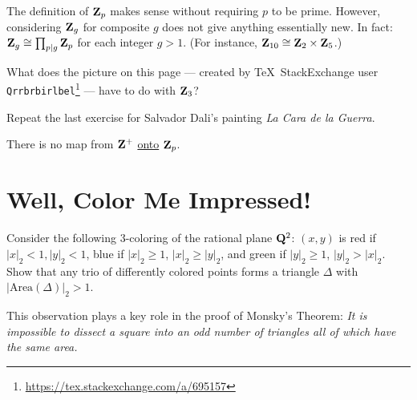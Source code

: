 \begin{prob}\label{prob:59} The definition of $\Z_p$ makes sense without requiring $p$ to be prime. However, considering $\mathbf{Z}_g$ for composite $g$ does not give anything essentially new. In fact: $\mathbf{Z}_{g}\cong \prod_{p\mid g} \mathbf{Z}_p$ for each integer $g>1$. (For instance, $\mathbf{Z}_{10} \cong \mathbf{Z}_2\times \mathbf{Z}_5$.)
\end{prob}


\begin{prob}\label{ex:3adicpic}\label{prob:60} What does the picture on this page --- created by \TeX~StackExchange user \texttt{
Qrrbrbirlbel}\footnote{\url{https://tex.stackexchange.com/a/695157}} --- have to do with $\mathbf{Z}_3$?
\end{prob}


\begin{prob}[Steuding]\label{ex:dali} Repeat the last exercise for Salvador Dali's painting \emph{La Cara de la Guerra}.
\end{prob}

\begin{prob}[$\Z_p$ is uncountable]\label{prob:61} There is no map from $\mathbf{Z}^{+}$ \underline{onto} $\Z_p$.
\end{prob}

\vspace{-0.1in}
\section*{Well, Color Me Impressed!}
\begin{prob}\label{prob:62} Consider the following $3$-coloring of the rational plane $\mathbf{Q}^{2}$: $(x,y)$ is \textsf{red} if $|x|_2 < 1, |y|_2 < 1$, \textsf{blue} if $|x|_2 \ge 1$, $|x|_2 \ge |y|_2$, and \textsf{green} if $|y|
_2 \ge 1$, $|y|_2 > |x|_2$. Show that any trio of differently colored points forms a triangle $\Delta$ with $|\mathrm{Area}(\Delta)|_2 > 1$.

{\scriptsize This observation plays a key role in the proof of \textsf{Monsky's Theorem}: \emph{It is impossible to dissect a square into an odd number of triangles all of which have the same area.}}
\end{prob}
